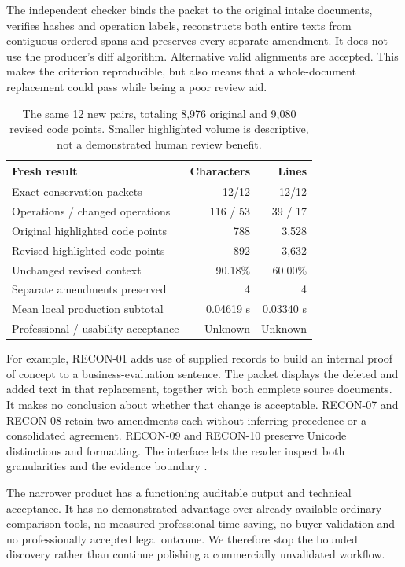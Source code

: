 \documentclass[10pt,a4paper]{article}
\begin{document}
The independent checker binds the packet to the original intake documents, verifies hashes and operation labels, reconstructs both entire texts from contiguous ordered spans and preserves every separate amendment. It does not use the producer's diff algorithm. Alternative valid alignments are accepted. This makes the criterion reproducible, but also means that a whole-document replacement could pass while being a poor review aid.

\begin{table}[H]\small
\begin{tabularx}{\textwidth}{@{}Yrr@{}}\toprule
\textbf{Fresh result} & \textbf{Characters} & \textbf{Lines}\\\midrule
Exact-conservation packets & 12/12 & 12/12\\
Operations / changed operations & 116 / 53 & 39 / 17\\
Original highlighted code points & 788 & 3,528\\
Revised highlighted code points & 892 & 3,632\\
Unchanged revised context & 90.18\% & 60.00\%\\
Separate amendments preserved & 4 & 4\\
Mean local production subtotal & 0.04619 s & 0.03340 s\\
Professional / usability acceptance & Unknown & Unknown\\\bottomrule
\end{tabularx}
\caption{The same 12 new pairs, totaling 8,976 original and 9,080 revised code points. Smaller highlighted volume is descriptive, not a demonstrated human review benefit.}
\end{table}

For example, RECON-01 adds use of supplied records to build an internal proof of concept to a business-evaluation sentence. The packet displays the deleted and added text in that replacement, together with both complete source documents. It makes no conclusion about whether that change is acceptable. RECON-07 and RECON-08 retain two amendments each without inferring precedence or a consolidated agreement. RECON-09 and RECON-10 preserve Unicode distinctions and formatting. The interface lets the reader inspect both granularities and the evidence boundary \cite{reconrun}.

The narrower product has a functioning auditable output and technical acceptance. It has no demonstrated advantage over already available ordinary comparison tools, no measured professional time saving, no buyer validation and no professionally accepted legal outcome. We therefore stop the bounded discovery rather than continue polishing a commercially unvalidated workflow.
\end{document}
